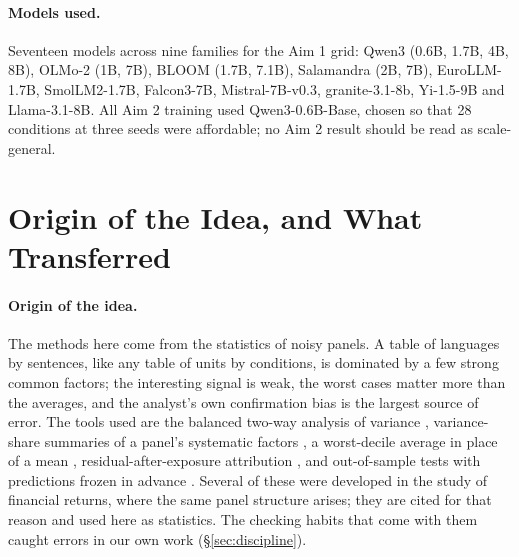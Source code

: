 \documentclass[11pt,a4paper]{article}
\begin{document}
\paragraph{Models used.} Seventeen models across nine families for the Aim 1
grid: Qwen3 (0.6B, 1.7B, 4B, 8B), OLMo-2 (1B, 7B), BLOOM (1.7B, 7.1B),
Salamandra (2B, 7B), EuroLLM-1.7B, SmolLM2-1.7B, Falcon3-7B, Mistral-7B-v0.3,
granite-3.1-8b, Yi-1.5-9B and Llama-3.1-8B. All Aim 2 training used
Qwen3-0.6B-Base, chosen so that 28 conditions at three seeds were affordable; no
Aim 2 result should be read as scale-general.


\section{Origin of the Idea, and What Transferred}
\label{sec:quant}
\paragraph{Origin of the idea.} The methods here come from the statistics of
noisy panels. A table of languages by sentences, like any table of units by
conditions, is dominated by a few strong common factors; the interesting
signal is weak, the worst cases matter more than the averages, and the
analyst's own confirmation bias is the largest source of error. The tools
used are the balanced two-way analysis of variance \citep{fisher1925},
variance-share summaries of a panel's systematic factors
\citep{ross1976apt,fama1993factors}, a worst-decile average in place of a
mean \citep{artzner1999coherent,rockafellar2000cvar}, residual-after-exposure
attribution \citep{sharpe1966,jensen1968}, and out-of-sample tests with
predictions frozen in advance \citep{bailey2014deflated,lopezdeprado2018}.
Several of these were developed in the study of financial returns, where the
same panel structure arises; they are cited for that reason and used here as
statistics. The checking habits that come with them caught errors in our own
work (\S\ref{sec:discipline}).
\end{document}
